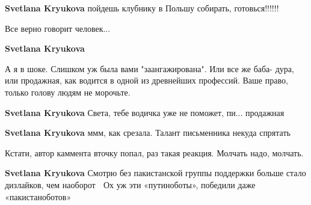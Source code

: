 \begin{itemize}
\begin{itemize}
\textbf{Svetlana Kryukova} пойдешь клубнику в Польшу собирать, готовься!!!!!!

 
Все верно говорит человек...

 
\textbf{Svetlana Kryukova} 

А я в шоке. Слишком уж была вами "заангажирована". Или все же баба- дура, или
продажная, как водится в одной из древнейших профессий. Ваше право, только
голову людям не морочьте.

 
\textbf{Svetlana Kryukova} Света, тебе водичка уже не поможет, пи... продажная

 
\textbf{Svetlana Kryukova} ммм, как срезала. Талант письменника некуда спрятать

 
Кстати, автор каммента вточку попал, раз такая реакция. Молчать надо, молчать.

 
\textbf{Svetlana Kryukova} Смотрю без пакистанской группы поддержки больше стало дизлайков, чем наоборот 🧐 Ох уж эти «путиноботы», победили даже «пакистаноботов» \Laughey[1.0][white]


\end{itemize}
\end{itemize}
